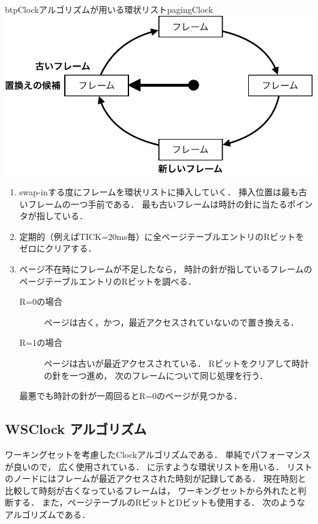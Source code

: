 \begin{myfig}{btp}{Clockアルゴリズムが用いる環状リスト}{pagingClock}
  \includegraphics[scale=0.66]{Fig/pagingClock-crop.pdf}
\end{myfig}

\begin{enumerate}
\item swap-inする度にフレームを環状リストに挿入していく．
  挿入位置は最も古いフレームの一つ手前である．
  最も古いフレームは時計の針に当たるポインタが指している．
\item 定期的（例えばTICK=20ms毎）に全ページテーブルエントリのRビットを
  ゼロにクリアする．
\item ページ不在時にフレームが不足したなら，
  時計の針が指しているフレームのページテーブルエントリのRビットを調べる．
  \begin{description}
  \item[R=0の場合]
    ページは古く，かつ，最近アクセスされていないので置き換える．
  \item[R=1の場合]
    ページは古いが最近アクセスされている．
    Rビットをクリアして時計の針を一つ進め，
    次のフレームについて同じ処理を行う．
  \end{description}
  最悪でも時計の針が一周回るとR=0のページが見つかる．
\end{enumerate}

\subsection{WSClock アルゴリズム}
ワーキングセットを考慮したClockアルゴリズムである．
単純でパフォーマンスが良いので，
広く使用されている\cite{wsClock}．
に示すような環状リストを用いる．
リストのノードにはフレームが最近アクセスされた時刻が記録してある．
現在時刻と比較して時刻が古くなっているフレームは，
ワーキングセットから外れたと判断する．
また，ページテーブルのRビットとDビットも使用する．
次のようなアルゴリズムである．

